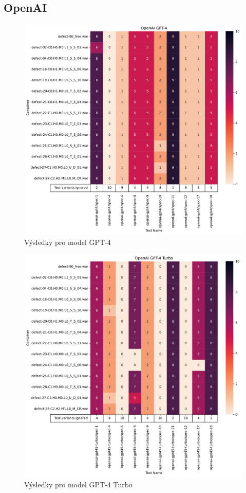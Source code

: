 \documentclass[czech, ma, kiv, he, iso690alph, pdf, viewonly]{fasthesis}
\begin{document}
        \subsection{OpenAI}

            \begin{figure}
                \includegraphics[width=\textwidth]{pic/gpt-4-results.pdf}
                \caption{Výsledky pro model GPT-4}
                \label{fig:res:gpt-4}
            \end{figure}

            \begin{figure}
                \includegraphics[width=\textwidth]{pic/gpt-4-turbo-results.pdf}
                \caption{Výsledky pro model GPT-4 Turbo}
                \label{fig:res:gpt-4-turbo}
            \end{figure}
\end{document}
